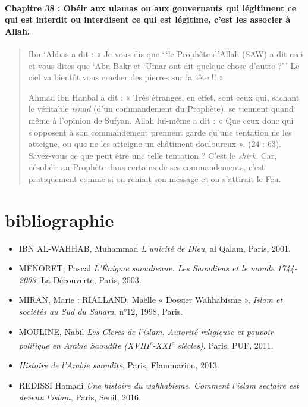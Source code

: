 \paragraph{{Chapitre 38} : Obéir aux ulamas ou aux gouvernants
qui légitiment ce qui est interdit ou interdisent ce qui est légitime,
c'est les associer à Allah.}
\begin{quote}
Ibn `Abbas a dit : « Je vous dis que `\,`le Prophète d'Allah (SAW) a dit
ceci et vous dites que `Abu Bakr et `Umar ont dit quelque chose d'autre
?'\,' Le ciel va bientôt vous cracher des pierres sur la tête !! »

Ahmad ibn Hanbal a dit : « Très étranges, en effet, sont ceux qui,
sachant le véritable \emph{isnad} (d'un commandement du Prophète), se
tiennent quand même à l'opinion de Sufyan. Allah lui-même a dit : « Que
ceux donc qui s'opposent à son commandement prennent garde qu'une
tentation ne les atteigne, ou que ne les atteigne un châtiment
douloureux ». (24 : 63). Savez-vous ce que peut être une telle tentation
? C'est le \emph{shirk}. Car, désobéir au Prophète dans certains de ses
commandements, c'est pratiquement comme si on reniait son message et on
s'attirait le Feu.

\end{quote}


\section{bibliographie}

 

\begin{itemize}
\item
 
  IBN AL-WAHHAB, Muhammad \emph{L'unicité de Dieu}, al Qalam, Paris,
  2001.
 


 \item
MENORET, Pascal \emph{L'Énigme saoudienne. Les Saoudiens et le monde
1744-2003}, La Découverte, Paris, 2003.
\item
MIRAN, Marie ; RIALLAND, Maëlle « Dossier Wahhabisme », \emph{Islam et
sociétés au Sud du Sahara}, n°12, 1998, Paris.
\item
MOULINE, Nabil \emph{Les Clercs de l'islam. Autorité religieuse et
pouvoir politique en Arabie Saoudite
(XVIII\textsuperscript{e}-XXI\textsuperscript{e} siècles)}, Paris, PUF,
2011.
\item
  \emph{Histoire de l'Arabie
saoudite}, Paris, Flammarion, 2013.
\item
REDISSI Hamadi \emph{Une histoire du wahhabisme. Comment l'islam
sectaire est devenu l'islam}, Paris, Seuil, 2016.
 \end{itemize}
 
